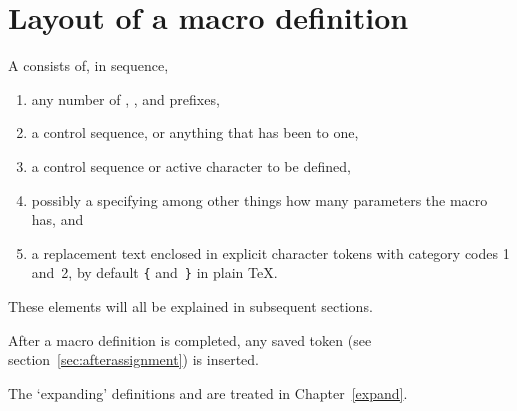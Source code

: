 \documentclass[letterpaper]{book}
\begin{document}
\section{Layout of a macro definition}

A  consists of, in sequence,
\begin{enumerate} \item any number of ,
, and  prefixes,
\item a  control sequence, or anything
that has been  to one,
\item a control sequence or active character to be defined, 
\item possibly a  specifying among other things
how many parameters the macro has, and
\item a replacement text enclosed in explicit character tokens
with category codes 1 and~2,
by default \verb-{- and~\verb-}-
in plain \TeX.
\end{enumerate}
These elements will all be explained in subsequent sections.

After a macro definition is completed, any saved 
token (see section~\ref{sec:afterassignment}) is inserted.

The `expanding' definitions  and 
are treated in Chapter~\ref{expand}.
\end{document}

